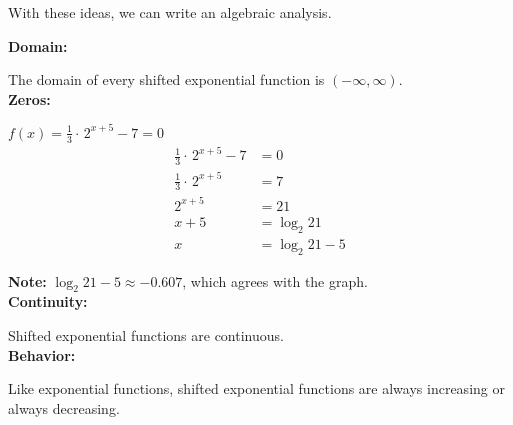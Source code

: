 \documentclass{ximera}
\begin{document}
\begin{example}
\begin{idea}
\begin{image}
\end{image}




With these ideas, we can write an algebraic analysis.




\end{idea}












\textbf{Domain:} 

The domain of every shifted exponential function is $(-\infty, \infty)$. \\



\textbf{Zeros:}  



$f(x) = \frac{1}{3} \cdot \, 2^{x+5} - 7 = 0$ \\


\begin{align*}
\frac{1}{3} \cdot \, 2^{x+5} - 7 & = 0 \\
\frac{1}{3} \cdot \, 2^{x+5} & = 7 \\
2^{x+5} & = 21 \\
x+5 & = \log_2{21} \\
x & = \log_2{21} - 5
\end{align*}

\textbf{Note:}  $\log_2{21} - 5 \approx -0.607$, which agrees with the graph. \\




\textbf{Continuity:}  

Shifted exponential functions are continuous.  \\








\textbf{Behavior:} 

Like exponential functions, shifted exponential functions are always increasing or always decreasing. \\




\end{example}
\end{document}
